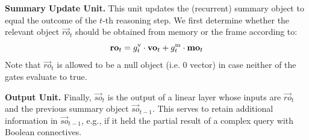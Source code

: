 \noindent\textbf{Summary Update Unit.}
This unit updates the (recurrent) summary object to equal the outcome of the $t$-th reasoning step.
We first determine whether the relevant object $\vec{ro}_t$ should be obtained from memory or the frame according to:
\[ \mathbf{ro}_t = g^{\mathrm{v}}_t \cdot \mathbf{vo}_t + g^{\mathrm{m}}_t \cdot \mathbf{mo}_t \]
Note that $\vec{ro}_t$ is allowed to be a null object (i.e. 0 vector) in case neither of the gates evaluate to true.

\smallskip

\noindent\textbf{Output Unit.} Finally, $\vec{so}_t$ is the output of a linear layer whose inputs are $\vec{ro}_t$ and the previous summary object $\vec{so}_{t-1}$.
This serves to retain additional information in $\vec{so}_{t-1}$, e.g., if it held the partial result of a complex query with Boolean connectives.


